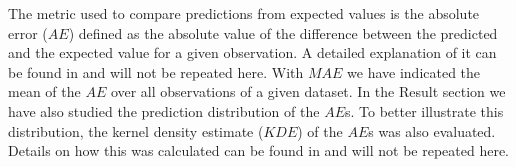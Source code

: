 \documentclass[sensors,article,submit,moreauthors,pdftex,10pt,a4paper]{Definitions/mdpi}
\begin{document}
The metric used to compare predictions from expected values is the absolute error ($AE$) defined as the absolute value of the difference between the predicted and the expected value for a given observation. 
A detailed explanation of it can be found in \cite{Michelucci2019_2} and will not be repeated here. With $MAE$ we have indicated the mean of the $AE$ over all observations of a given dataset. 
In the Result section we have also studied the prediction distribution of the $AE$s. To better illustrate this distribution, the kernel density estimate ($KDE$) of the $AE$s was also evaluated. Details on how this was calculated can be found in \cite{Michelucci2019_2} and will not be repeated here.
%
%
\end{document}
